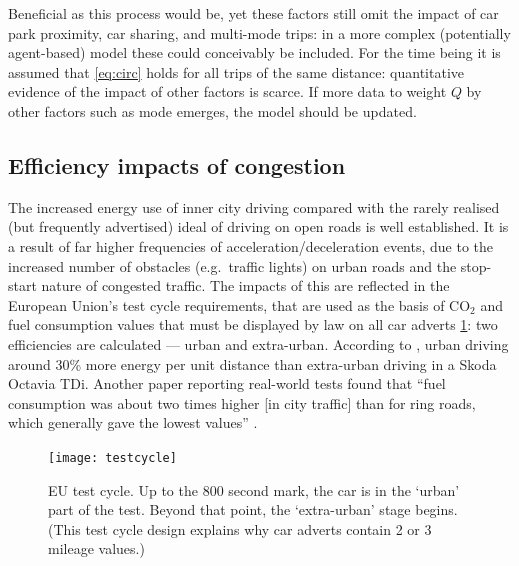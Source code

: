Beneficial as this process would be, yet these factors still omit
the impact of car park proximity, car sharing,
and multi-mode trips: in a more complex (potentially agent-based) model these
could conceivably be included.
For the time being it is assumed that \cref{eq:circ} holds for
all trips of the same distance: quantitative evidence of the impact of other
factors is scarce. If more data to weight $Q$ by other factors such
as mode emerges, the model should be updated.

\subsection{Efficiency impacts of congestion}

The increased energy use of inner city driving compared with the rarely
realised (but frequently advertised) ideal of driving on open roads is
well established.
It is a result of far higher frequencies of acceleration/deceleration
events, due to the increased number of obstacles (e.g.~traffic lights) on
urban roads and the stop-start nature of congested traffic.
The impacts of this are reflected in the European Union's test cycle
requirements, that are used as the basis of CO$_{2}$ and fuel consumption
values that must be displayed by law on all car adverts \cref{f:testcycle}:
two efficiencies are calculated --- urban and extra-urban. According to
\citet{Pelkmans2006}, urban driving around 30\% more energy per unit distance
than extra-urban driving in a Skoda Octavia TDi. Another paper reporting
real-world tests found that ``fuel consumption was about two times higher
[in city traffic] than for ring roads, which generally gave the lowest values''
\citep[p.~4649]{Vlieger2000}.

\begin{figure}[h]
  \centerline{
    \texttt{[image: testcycle]}}
  \caption[EU test cycle]{EU test cycle. Up to the 800 second mark,
  the car is in the `urban' part of the test. Beyond that point,
  the `extra-urban' stage begins.(This test cycle design explains
  why car adverts contain 2 or 3 mileage values.)}
  \label{f:testcycle}
\end{figure}

